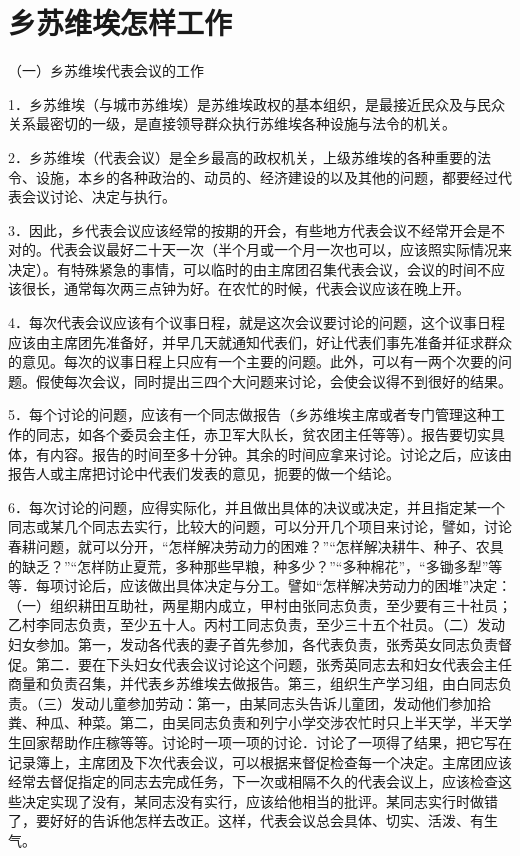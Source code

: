\section[乡苏维埃怎样工作（一九三三年）]{乡苏维埃怎样工作}


（一）乡苏维埃代表会议的工作

1．乡苏维埃（与城市苏维埃）是苏维埃政权的基本组织，是最接近民众及与民众关系最密切的一级，是直接领导群众执行苏维埃各种设施与法令的机关。

2．乡苏维埃（代表会议）是全乡最高的政权机关，上级苏维埃的各种重要的法令、设施，本乡的各种政治的、动员的、经济建设的以及其他的问题，都要经过代表会议讨论、决定与执行。

3．因此，乡代表会议应该经常的按期的开会，有些地方代表会议不经常开会是不对的。代表会议最好二十天一次（半个月或一个月一次也可以，应该照实际情况来决定）。有特殊紧急的事情，可以临时的由主席团召集代表会议，会议的时间不应该很长，通常每次两三点钟为好。在农忙的时候，代表会议应该在晚上开。

4．每次代表会议应该有个议事日程，就是这次会议要讨论的问题，这个议事日程应该由主席团先准备好，并早几天就通知代表们，好让代表们事先准备并征求群众的意见。每次的议事日程上只应有一个主要的问题。此外，可以有一两个次要的问题。假使每次会议，同时提出三四个大问题来讨论，会使会议得不到很好的结果。

5．每个讨论的问题，应该有一个同志做报告（乡苏维埃主席或者专门管理这种工作的同志，如各个委员会主任，赤卫军大队长，贫农团主任等等）。报告要切实具体，有内容。报告的时间至多十分钟。其余的时间应拿来讨论。讨论之后，应该由报告人或主席把讨论中代表们发表的意见，扼要的做一个结论。

6．每次讨论的问题，应得实际化，并且做出具体的决议或决定，并且指定某一个同志或某几个同志去实行，比较大的问题，可以分开几个项目来讨论，譬如，讨论春耕问题，就可以分开，“怎样解决劳动力的困难？”“怎样解决耕牛、种子、农具的缺乏？”“怎样防止夏荒，多种那些早粮，种多少？”“多种棉花”，“多锄多犁”等等．每项讨论后，应该做出具体决定与分工。譬如“怎样解决劳动力的困堆”决定：（一）组织耕田互助社，两星期内成立，甲村由张同志负责，至少要有三十社员；乙村李同志负责，至少五十人。丙村工同志负责，至少三十五个社员。（二）发动妇女参加。第一，发动各代表的妻子首先参加，各代表负责，张秀英女同志负责督促。第二．要在下头妇女代表会议讨论这个问题，张秀英同志去和妇女代表会主任商量和负责召集，并代表乡苏维埃去做报告。第三，组织生产学习组，由白同志负责。（三）发动儿童参加劳动：第一，由某同志头告诉儿童团，发动他们参加拾粪、种瓜、种菜。第二，由吴同志负责和列宁小学交涉农忙时只上半天学，半天学生回家帮助作庄稼等等。讨论时一项一项的讨论．讨论了一项得了结果，把它写在记录簿上，主席团及下次代表会议，可以根据来督促检查每一个决定。主席团应该经常去督促指定的同志去完成任务，下一次或相隔不久的代表会议上，应该检查这些决定实现了没有，某同志没有实行，应该给他相当的批评。某同志实行时做错了，要好好的告诉他怎样去改正。这样，代表会议总会具体、切实、活泼、有生气。

